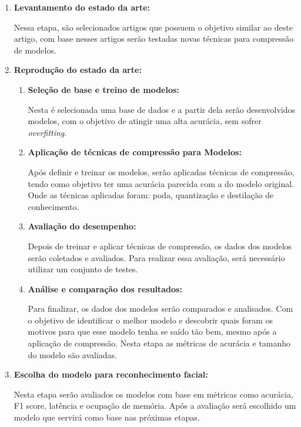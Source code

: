 \begin{enumerate}
	\item \textbf{Levantamento do estado da arte:}

		Nessa etapa, são selecionados artigos que possuem o objetivo similar ao deste artigo,
		com base nesses artigos serão testadas novas técnicas para compressão de modelos.

	\item \textbf{Reprodução do estado da arte:}

	\begin{enumerate}
		\item \textbf{Seleção de base e treino de modelos:}

			Nesta é selecionada uma base de dados e a partir dela serão desenvolvidos modelos,
			com o objetivo de atingir uma alta acurácia, sem sofrer \textit{overfitting}.

		\item \textbf{Aplicação de técnicas de compressão para Modelos:}

			Após definir e treinar os modelos, serão aplicadas técnicas de compressão, tendo como
			objetivo ter uma acurácia parecida com a do modelo original. Onde as técnicas aplicadas
			foram: poda, quantização e destilação de conhecimento.

		\item \textbf{Avaliação do desempenho:}

			Depois de treinar e aplicar técnicas de compressão, os dados dos modelos serão coletados e
			avaliados. Para realizar essa avaliação, será necessário utilizar um conjunto de testes.

		\item \textbf{Análise e comparação dos resultados:}

			Para finalizar, os dados dos modelos serão comparados e analisados. Com o objetivo de
			identificar o melhor modelo e descobrir quais foram os motivos para que esse modelo tenha se
			saído tão bem, mesmo após a aplicação de compressão. Nesta etapa as métricas de acurácia e
			tamanho do modelo são avaliadas.
	\end{enumerate}

	\item \textbf{Escolha do modelo para reconhecimento facial:}

		Nesta etapa serão avaliados os modelos com base em métricas como acurácia, F1 score, latência e ocupação de
		memória. Após a avaliação será escolhido um modelo que servirá como base nas próximas etapas.


\end{enumerate}

